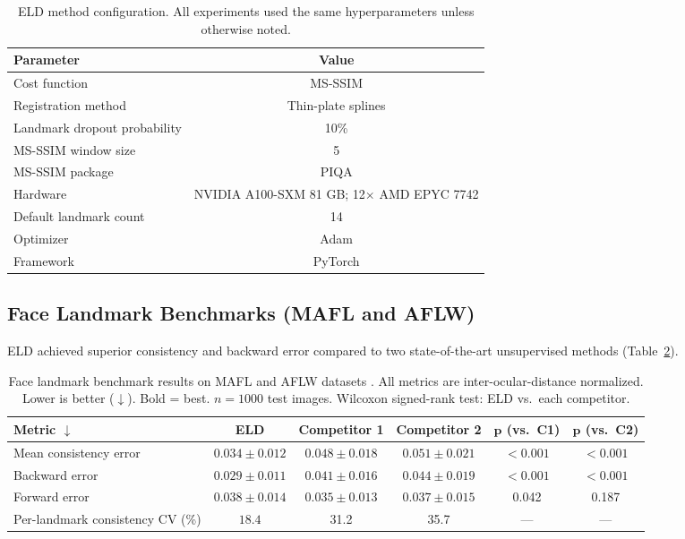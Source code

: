 \documentclass[11pt]{article}
\begin{document}
\begin{table}[H]
\centering
\caption{ELD method configuration. All experiments used the same hyperparameters unless otherwise noted.}
\label{tab:config}
\begin{tabular}{lc}
\toprule
\textbf{Parameter} & \textbf{Value} \\
\midrule
Cost function & MS-SSIM \citep{wang2019ssim} \\
Registration method & Thin-plate splines \citep{bookstein1989principal} \\
Landmark dropout probability & 10\% \\
MS-SSIM window size & 5 \\
MS-SSIM package & PIQA \citep{piqa2020package} \\
Hardware & NVIDIA A100-SXM 81 GB; 12$\times$ AMD EPYC 7742 \\
Default landmark count & 14 \\
Optimizer & Adam \citep{kingma2014adam} \\
Framework & PyTorch \citep{paszke2019pytorch} \\
\bottomrule
\end{tabular}
\end{table}

\subsection{Face Landmark Benchmarks (MAFL and AFLW)}

ELD achieved superior consistency and backward error compared to two state-of-the-art unsupervised methods (Table~\ref{tab:face_bench}).

\begin{table}[H]
\centering
\caption{Face landmark benchmark results on MAFL and AFLW datasets \citep{mafl2015deep, koestinger2011aflw}. All metrics are inter-ocular-distance normalized. Lower is better ($\downarrow$). Bold = best. $n = 1000$ test images. Wilcoxon signed-rank test: ELD vs.\ each competitor.}
\label{tab:face_bench}
\begin{tabular}{lccccc}
\toprule
\textbf{Metric $\downarrow$} & \textbf{ELD} & \textbf{Competitor 1} & \textbf{Competitor 2} & $\boldsymbol{p}$ \textbf{(vs.\ C1)} & $\boldsymbol{p}$ \textbf{(vs.\ C2)} \\
\midrule
Mean consistency error & $\mathbf{0.034 \pm 0.012}$ & $0.048 \pm 0.018$ & $0.051 \pm 0.021$ & $< 0.001$ & $< 0.001$ \\
Backward error & $\mathbf{0.029 \pm 0.011}$ & $0.041 \pm 0.016$ & $0.044 \pm 0.019$ & $< 0.001$ & $< 0.001$ \\
Forward error & $0.038 \pm 0.014$ & $\mathbf{0.035 \pm 0.013}$ & $0.037 \pm 0.015$ & 0.042 & 0.187 \\
Per-landmark consistency CV (\%) & $\mathbf{18.4}$ & 31.2 & 35.7 & --- & --- \\
\bottomrule
\end{tabular}
\end{table}
\end{document}
